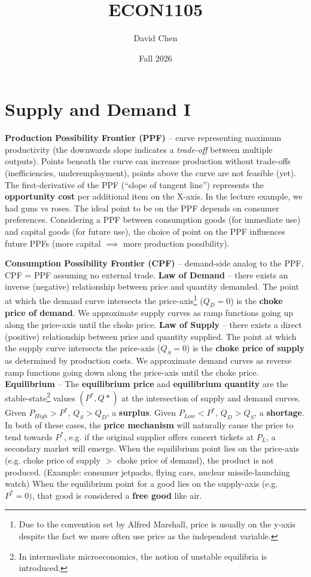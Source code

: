 \documentclass{article}
\title{ECON1105}
\author{David Chen}
\date{Fall 2026}
\def\term #1{\termb{#1} --}
\def\termb #1{\1 \textbf{#1}}
\begin{document}
\maketitle

\section{Supply and Demand I}
\begin{outline}
    \term{Production Possibility Frontier (PPF)}
        curve representing maximum productivity (the downwards slope indicates a \textit{trade-off} between multiple outputs). Points beneath the curve can increase production without trade-offs (inefficiencies, underemployment), points above the curve are not feasible (yet).
        \2 The first-derivative of the PPF (``slope of tangent line'') represents the \textbf{opportunity cost} per additional item on the X-axis. In the lecture example, we had guns vs roses.
        \2 The ideal point to be on the PPF depends on consumer preferences.
        \2 Considering a PPF between consumption goods (for immediate use) and capital goods (for future use), the choice of point on the PPF influences future PPFs (more capital $\implies$ more production possibility).

    \term{Consumption Possibility Frontier (CPF)}
        demand-side analog to the PPF, CPF = PPF assuming no external trade.
    \term{Law of Demand}
        there exists an inverse (negative) relationship between price and quantity demanded.
        \2 The point at which the demand curve intersects the price-axis\footnote{Due to the convention set by Alfred Marshall, price is usually on the y-axis despite the fact we more often use price as the independent variable.} ($Q_D=0$) is the \textbf{choke price of demand}.
        \2 We approximate supply curves as ramp functions going up along the price-axis until the choke price.
    \term{Law of Supply}
        there exists a direct (positive) relationship between price and quantity supplied.
        \2 The point at which the supply curve intersects the price-axis ($Q_S=0$) is the \textbf{choke price of supply} as determined by production costs.
        \2 We approximate demand curves as reverse ramp functions going down along the price-axis until the choke price.
    \term{Equilibrium} The \textbf{equilibrium price} and \textbf{equilibrium quantity} are the stable-state\footnote{In intermediate microeconomics, the notion of unstable equilibria is introduced.} values $(P^*, Q*)$ at the intersection of supply and demand curves.
        \2 Given $P_{High} > P^*$, $Q_S>Q_D$, a \textbf{surplus}.
        \2 Given $P_{Low} < P^*$, $Q_D>Q_S$, a \textbf{shortage}.
        \3 In both of these cases, the \textbf{price mechanism} will naturally cause the price to tend towards $P^*$, e.g. if the original supplier offers concert tickets at $P_L$, a secondary market will emerge.
        \2 When the equilibrium point lies on the price-axis (e.g. choke price of supply $>$ choke price of demand), the product is not produced. (Example: consumer jetpacks, flying cars, nuclear missile-launching watch)
        \2 When the equilibrium point for a good lies on the supply-axis (e.g. $P^*=0)$, that good is considered a \textbf{free good} like air.
\end{outline}
\end{document}
